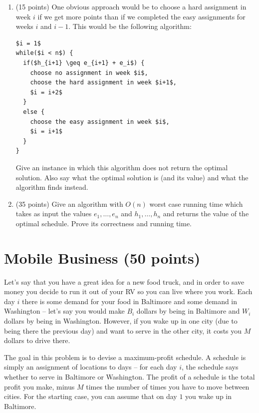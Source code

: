 \documentclass[11pt]{article}
\begin{document}
\begin{enumerate}
\item (15 points) One obvious approach would be to choose a hard assignment in week $i$ if we get more points than if we completed the easy assignments for weeks $i$ and $i-1$.  This would be the following algorithm:

\begin{lstlisting}[mathescape]
$i = 1$
while($i < n$) {
  if($h_{i+1} \geq e_{i+1} + e_i$) {
    choose no assignment in week $i$,
    choose the hard assignment in week $i+1$,
    $i = i+2$
  }
  else {
    choose the easy assignment in week $i$,
    $i = i+1$
  }
}
\end{lstlisting}

Give an instance in which this algorithm does not return the optimal solution.  Also say what the optimal solution is (and its value) and what the algorithm finds instead.




\item (35 points) Give an algorithm with $O(n)$ worst case running time which takes as input the values $e_1, \dots, e_n$ and $h_1, \dots, h_n$ and returns the value of the optimal schedule.  Prove its correctness and running time.
\end{enumerate}



\section{Mobile Business (50 points)}
Let's say that you have a great idea for a new food truck, and in order to save money you decide to run it out of your RV so you can live where you work.  Each day $i$ there is some demand for your food in Baltimore and some demand in Washington -- let's say you would make $B_i$ dollars by being in Baltimore and $W_i$ dollars by being in Washington.  However, if you wake up in one city (due to being there the previous day) and want to serve in the other city, it costs you $M$ dollars to drive there.  

The goal in this problem is to devise a maximum-profit schedule.  A schedule is simply an assignment of locations to days -- for each day $i$, the schedule says whether to serve in Baltimore or Washington.  The profit of a schedule is the total profit you make, minus $M$ times the number of times you have to move between cities.  For the starting case, you can assume that on day $1$ you wake up in Baltimore.
\end{document}
